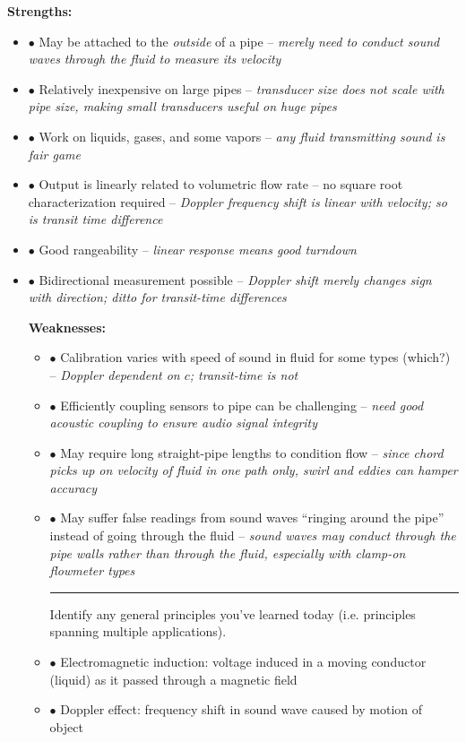 \begin{itemize}
\begin{itemize}
{\bf Strengths:}

\begin{itemize}
\item{$\bullet$} May be attached to the {\it outside} of a pipe -- {\it merely need to conduct sound waves through the fluid to measure its velocity}
\item{$\bullet$} Relatively inexpensive on large pipes -- {\it transducer size does not scale with pipe size, making small transducers useful on huge pipes}
\item{$\bullet$} Work on liquids, gases, and some vapors -- {\it any fluid transmitting sound is fair game}
\item{$\bullet$} Output is linearly related to volumetric flow rate -- no square root characterization required -- {\it Doppler frequency shift is linear with velocity; so is transit time difference}
\item{$\bullet$} Good rangeability -- {\it linear response means good turndown}
\item{$\bullet$} Bidirectional measurement possible -- {\it Doppler shift merely changes sign with direction; ditto for transit-time differences}
\medskip

\vskip 10pt

{\bf Weaknesses:}

\begin{itemize}
\item{$\bullet$} Calibration varies with speed of sound in fluid for some types (which?) -- {\it Doppler dependent on $c$; transit-time is not}
\item{$\bullet$} Efficiently coupling sensors to pipe can be challenging -- {\it need good acoustic coupling to ensure audio signal integrity}
\item{$\bullet$} May require long straight-pipe lengths to condition flow -- {\it since chord picks up on velocity of fluid in one path only, swirl and eddies can hamper accuracy}
\item{$\bullet$} May suffer false readings from sound waves ``ringing around the pipe'' instead of going through the fluid -- {\it sound waves may conduct through the pipe walls rather than through the fluid, especially with clamp-on flowmeter types}
\medskip


\filbreak \vskip 5pt \hrule \vskip 5pt  \vskip 10pt

\noindent
Identify any general principles you've learned today (i.e. principles spanning multiple applications).
\item{$\bullet$} Electromagnetic induction: voltage induced in a moving conductor (liquid) as it passed through a magnetic field
\item{$\bullet$} Doppler effect: frequency shift in sound wave caused by motion of object
\medskip


\end{itemize}
\end{itemize}
\end{itemize}
\end{itemize}
